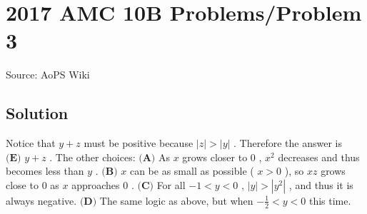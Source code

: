 \documentclass[12pt]{article}
\begin{document}
\section*{{2017 AMC 10B Problems/Problem 3}}
Source: AoPS Wiki

\subsection*{Solution}
Notice that $y+z$ must be positive because $|z|>|y|$ . Therefore the answer is $\boxed{\textbf{(E) } y+z}$ . The other choices: $\textbf{(A)}$ As $x$ grows closer to $0$ , $x^2$ decreases and thus becomes less than $y$ . $\textbf{(B)}$ $x$ can be as small as possible ( $x>0$ ), so $xz$ grows close to $0$ as $x$ approaches $0$ . $\textbf{(C)}$ For all $-1<y<0$ , $|y|>|y^2|$ , and thus it is always negative. $\textbf{(D)}$ The same logic as above, but when $-\frac{1}{2}<y<0$ this time.
\end{document}
